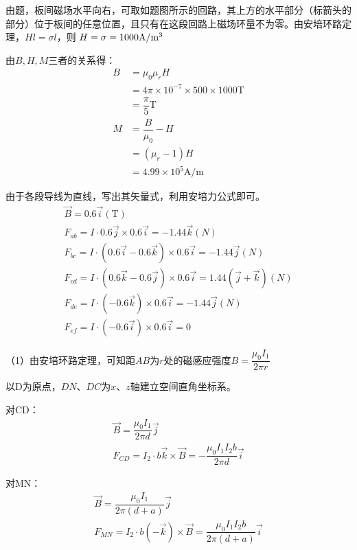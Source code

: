 \documentclass[b5paper,opensource,sourcefont,parskip]{qyxf-book}
\begin{document}
\solve
由题，板间磁场水平向右，可取如题图所示的回路，其上方的水平部分（标箭头的部分）位于板间的任意位置，且只有在这段回路上磁场环量不为零。由安培环路定理，$Hl=\sigma l$，则
$H=\sigma=1000 \textrm{A/m}\footnotemark[3]$

由$B,H,M$三者的关系得：
\begin{align*}
B&=\mu_0\mu_rH\\
&=4\pi\times 10^{-7}\times 500\times 1000 \textrm{T}\\
&=\dfrac{\pi}{5} \textrm{T}\\	
M&=\dfrac{B}{\mu_0}-H\\
&=(\mu_r-1)H\\
&=4.99\times 10^5 \textrm{A/m}
\end{align*}


\solve
由于各段导线为直线，写出其矢量式，利用安培力公式即可\footnotemark[4]。
\begin{gather*}
\vec{B}=0.6\vec{i}(\textrm{T})\\
F_{ab}=I\cdot 0.6\vec{j}\times 0.6\vec{i}=-1.44\vec{k}(N)\\
F_{bc}=I\cdot (0.6\vec{i}-0.6\vec{k})\times 0.6\vec{i}=-1.44\vec{j}(N)\\
F_{cd}=I\cdot (0.6\vec{k}-0.6\vec{j})\times 0.6\vec{i}=1.44(\vec{j}+\vec{k})(N)\\
F_{de}=I\cdot (-0.6\vec{k})\times 0.6\vec{i}=-1.44\vec{j}(N)\\
F_{ef}=I\cdot (-0.6\vec{i})\times 0.6\vec{i}=0
\end{gather*}


\solve
（1）由安培环路定理，可知距$AB$为$r$处的磁感应强度$B=\dfrac{\mu_0I_1}{2\pi r}$

以D为原点，$DN$、$DC$为$x$、$z$轴建立空间直角坐标系。

对CD：
\begin{gather*}
\vec{B}=\dfrac{\mu_0I_1}{2\pi d}\vec{j}\\
F_{CD}=I_2\cdot b\vec{k}\times \vec{B}=-\dfrac{\mu_0I_1I_2b}{2\pi d}\vec{i}
\end{gather*}

对MN：
\begin{gather*}
\vec{B}=\dfrac{\mu_0I_1}{2\pi (d+a)}\vec{j}\\
F_{MN}=I_2\cdot b(-\vec{k})\times \vec{B}=\dfrac{\mu_0I_1I_2b}{2\pi (d+a)}\vec{i}
\end{gather*}
\end{document}
